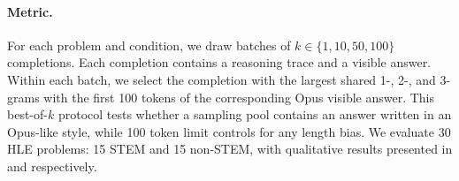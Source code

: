 \paragraph{Metric.} For each problem and condition, we draw batches of $k\in\{1,10,50,100\}$ completions. Each completion contains a reasoning trace and a visible answer. Within each batch, we select the completion with the largest shared 1-, 2-, and 3-grams with the first 100 tokens of the corresponding Opus visible answer. This best-of-$k$ protocol tests whether a sampling pool contains an answer written in an Opus-like style, while 100 token limit controls for any length bias. We evaluate 30 HLE problems: 15 STEM and 15 non-STEM, with qualitative results presented in  and  respectively.

